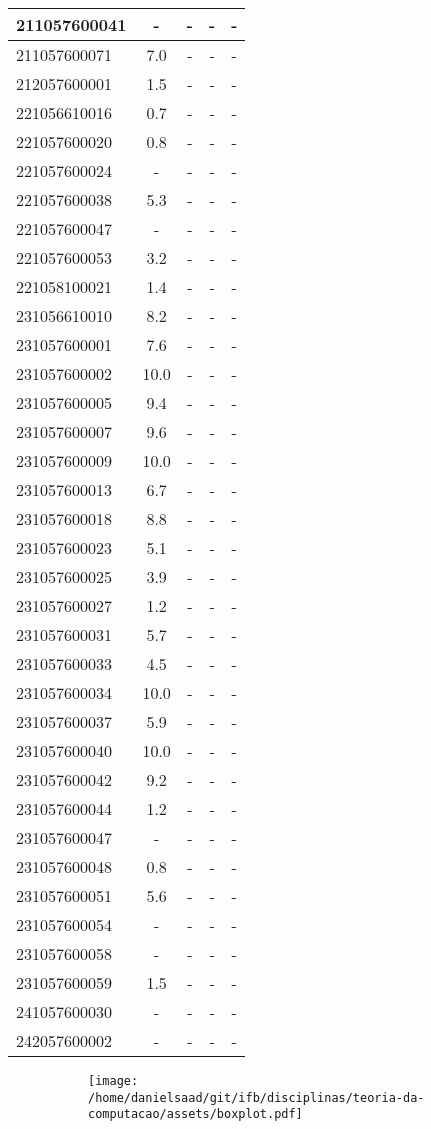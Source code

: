 \documentclass{article}
\begin{document}
\begin{longtable}{|l|c|c|c|c|}
211057600041 & - & - & - & -\\\hline
211057600071 & 7.0 & - & - & -\\\hline
212057600001 & 1.5 & - & - & -\\\hline
221056610016 & 0.7 & - & - & -\\\hline
221057600020 & 0.8 & - & - & -\\\hline
221057600024 & - & - & - & -\\\hline
221057600038 & 5.3 & - & - & -\\\hline
221057600047 & - & - & - & -\\\hline
221057600053 & 3.2 & - & - & -\\\hline
221058100021 & 1.4 & - & - & -\\\hline
231056610010 & 8.2 & - & - & -\\\hline
231057600001 & 7.6 & - & - & -\\\hline
231057600002 & 10.0 & - & - & -\\\hline
231057600005 & 9.4 & - & - & -\\\hline
231057600007 & 9.6 & - & - & -\\\hline
231057600009 & 10.0 & - & - & -\\\hline
231057600013 & 6.7 & - & - & -\\\hline
231057600018 & 8.8 & - & - & -\\\hline
231057600023 & 5.1 & - & - & -\\\hline
231057600025 & 3.9 & - & - & -\\\hline
231057600027 & 1.2 & - & - & -\\\hline
231057600031 & 5.7 & - & - & -\\\hline
231057600033 & 4.5 & - & - & -\\\hline
231057600034 & 10.0 & - & - & -\\\hline
231057600037 & 5.9 & - & - & -\\\hline
231057600040 & 10.0 & - & - & -\\\hline
231057600042 & 9.2 & - & - & -\\\hline
231057600044 & 1.2 & - & - & -\\\hline
231057600047 & - & - & - & -\\\hline
231057600048 & 0.8 & - & - & -\\\hline
231057600051 & 5.6 & - & - & -\\\hline
231057600054 & - & - & - & -\\\hline
231057600058 & - & - & - & -\\\hline
231057600059 & 1.5 & - & - & -\\\hline
241057600030 & - & - & - & -\\\hline
242057600002 & - & - & - & -\\\hline
\end{longtable}
\begin{figure}[h!]
\centering\begin{subfigure}
        \centering
        \texttt{[image: /home/danielsaad/git/ifb/disciplinas/teoria-da-computacao/assets/boxplot.pdf]}
    \end{subfigure}\end{figure}
\end{document}
